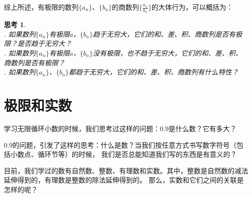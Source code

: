 \documentclass[12pt,UTF8]{ctexbook}
\newtheorem{sk}{思考}[section]
\begin{document}
综上所述，有极限的数列$\{a_n\}$、$\{b_n\}$的商数列$\{\frac{a_n}{b_n}\}$的大体行为，可以概括为：
\begin{center}
\end{center}

\begin{sk}
    \mbox{} \\
    . 如果数列$\{a_n\}$有极限$a$，$\{b_n\}$趋于无穷大，它们的和、差、积、商数列是否有极限？是否趋于无穷大？\\
    . 如果数列$\{a_n\}$有极限$a$，$\{b_n\}$没有极限，也不趋于无穷大，它们的和、差、积、商数列是否有极限？\\
    . 如果数列$\{a_n\}$、$\{b_n\}$都趋于无穷大，它们的和、差、积、商数列有什么特性？
\end{sk}

\section{极限和实数}
\begin{center}
\end{center}

学习无限循环小数的时候，我们思考过这样的问题：$0.\dot{9}$是什么数？它有多大？

$0.\dot{9}$的问题，引发了这样的思考：什么是数？当我们按任意方式书写数字符号（包括小数点、循环节等）的时候，
我们是否总能知道我们写的东西是有意义的？

目前，我们学过的数有自然数、整数、有理数和实数。其中，整数是自然数的减法延伸得到的，有理数是整数的除法延伸得到的。
那么，实数和它们之间的关联是怎样的呢？
\end{document}
